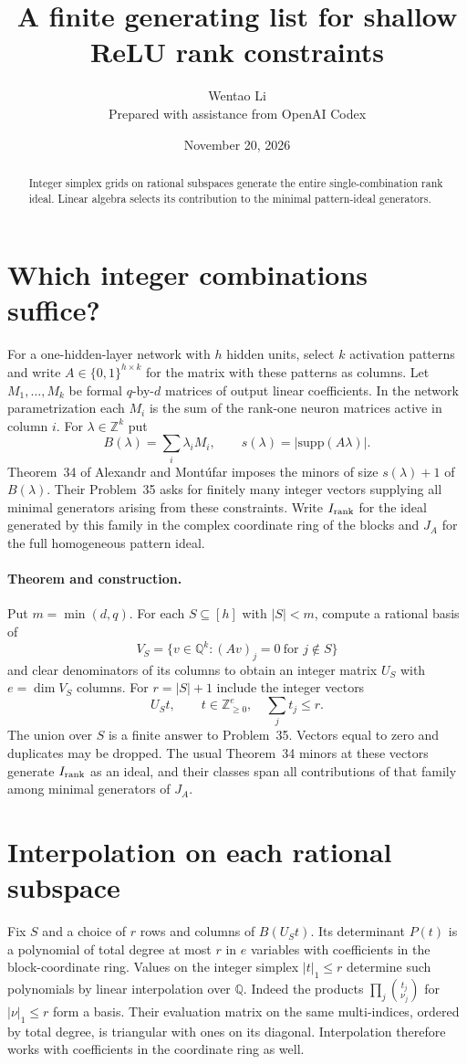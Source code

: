 \documentclass[11pt]{article}
\title{A finite generating list for shallow ReLU rank constraints}
\author{Wentao Li\\{\small Prepared with assistance from OpenAI Codex}}
\date{November 20, 2026}
\begin{document}
\maketitle
\begin{abstract}
Integer simplex grids on rational subspaces generate the entire single-combination rank ideal. Linear algebra selects its contribution to the minimal pattern-ideal generators.
\end{abstract}
\section*{Which integer combinations suffice?}
For a one-hidden-layer network with $h$ hidden units, select $k$ activation patterns and write $A\in\{0,1\}^{h\times k}$ for the matrix with these patterns as columns. Let $M_1,\ldots,M_k$ be formal $q$-by-$d$ matrices of output linear coefficients. In the network parametrization each $M_i$ is the sum of the rank-one neuron matrices active in column $i$. For $\lambda\in\mathbb Z^k$ put
\[
 B(\lambda)=\sum_i\lambda_i M_i,\qquad s(\lambda)=|\mathrm{supp}(A\lambda)|.
\]
Theorem~34 of Alexandr and Mont\'ufar imposes the minors of size $s(\lambda)+1$ of $B(\lambda)$. Their Problem~35 asks for finitely many integer vectors supplying all minimal generators arising from these constraints. Write $I_{\rm rank}$ for the ideal generated by this family in the complex coordinate ring of the blocks and $J_A$ for the full homogeneous pattern ideal.

\paragraph{Theorem and construction.} Put $m=\min(d,q)$. For each $S\subseteq[h]$ with $|S|<m$, compute a rational basis of
\[
 V_S=\{v\in\mathbb Q^k:(Av)_j=0\ \text{for }j\notin S\}
\]
and clear denominators of its columns to obtain an integer matrix $U_S$ with $e=\dim V_S$ columns. For $r=|S|+1$ include the integer vectors
\[
 U_S t,\qquad t\in\mathbb Z_{\ge0}^{e},\quad \sum_j t_j\le r .
\]
The union over $S$ is a finite answer to Problem~35. Vectors equal to zero and duplicates may be dropped. The usual Theorem~34 minors at these vectors generate $I_{\rm rank}$ as an ideal, and their classes span all contributions of that family among minimal generators of $J_A$.

\section*{Interpolation on each rational subspace}
Fix $S$ and a choice of $r$ rows and columns of $B(U_S t)$. Its determinant $P(t)$ is a polynomial of total degree at most $r$ in $e$ variables with coefficients in the block-coordinate ring. Values on the integer simplex $|t|_1\le r$ determine such polynomials by linear interpolation over $\mathbb Q$. Indeed the products $\prod_j\binom{t_j}{\nu_j}$ for $|\nu|_1\le r$ form a basis. Their evaluation matrix on the same multi-indices, ordered by total degree, is triangular with ones on its diagonal. Interpolation therefore works with coefficients in the coordinate ring as well.
\end{document}
